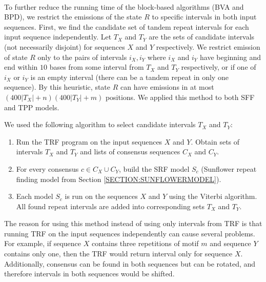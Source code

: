 \paragraph{}
To further reduce the running time of the block-based algorithms (BVA and BPD),
we restrict the emissions of the state $R$ to specific intervals in both input
sequences. First, we find the candidate set of tandem repeat intervals for
each input sequence independently. Let $T_X$ and $T_Y$ are the
sets of candidate intervals (not necessarily disjoint) for sequences $X$ and
$Y$ respectively. We restrict emission of state $R$ only to the pairs of
intervals $i_X, i_Y$ where $i_X$ and $i_Y$ have beginning and end within $10$
bases from some interval from $T_X$ and $T_Y$ respectively, or if one of $i_X$
or $i_Y$ is an empty interval (there can be a tandem repeat in only one
sequence).  By this heuristic, state $R$ can have emissions in at most
$(400|T_X|+n)(400|T_Y|+m)$ positions. We applied this method to both SFF and
TPP models.

We used the following algorithm to select candidate intervals $T_X$ and $T_Y$:
\begin{enumerate}[itemsep=-1mm]
\item Run the TRF program on the input sequences $X$ and $Y$. Obtain sets of
intervals $T_X$ and $T_Y$ and lists of consensus sequences $C_X$ and $C_Y$.

\item For every consensus $c\in C_X\cup C_Y$, build the SRF model $S_c$
(Sunflower repeat finding model from Section \ref{SECTION:SUNFLOWERMODEL}). 

\item Each model $S_c$ is run on the sequences $X$ and $Y$ using the Viterbi
algorithm. All found repeat intervals are added into corresponding sets $T_X$
and $T_Y$.

\end{enumerate}
The reason for using this method instead of using only intervals from TRF is
that running TRF on the input sequences independently can cause several
problems. For example, if sequence $X$ contains three repetitions of motif $m$
and sequence $Y$ contains only one, then the TRF would return interval only for
sequence $X$. Additionally, consensus can be found in both sequences but can be
rotated, and therefore intervals in both sequences would be shifted.


